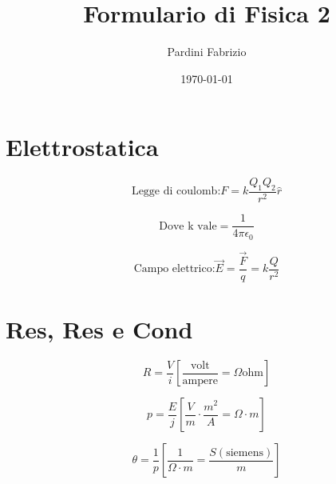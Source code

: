 \documentclass[a4paper,11pt]{article}
\begin{document}
	
	\setlength{\abovedisplayskip}{0pt}
	\setlength{\belowdisplayskip}{0pt}
	
	\title{\Large\bfseries Formulario di Fisica 2\vspace{-1em}}
	\author{Pardini Fabrizio\vspace{-1cm}}
	\date{\today\vspace{-1em}}
	\maketitle
	
	\begin{multicols}{3}
		\setlength{\columnseprule}{0.03pt}
		\def\columnseprulecolor{\color{black}}
		
		\section{Elettrostatica}
		
		
		\begin{equation}
			\text{Legge di coulomb:}F=k\frac{Q_{1}Q_{2}}{r^{2}}\hat{r}
		\end{equation}
	
		\begin{equation}
			\text{Dove k vale}=\frac{1}{4\pi\epsilon_{0}}
		\end{equation}
	
		
		\begin{equation}
			\text{Campo elettrico:}\vec{E}=\frac{\vec{F}}{q}=k\frac{Q}{r^{2}}
		\end{equation}
	
	
		\section{Res, Res e Cond}
		
		\begin{equation}
			R=\frac{V}{i} \left[
			\frac{\text{volt}}{\text{ampere}}=\Omega\text{ohm}
			\right]
		\end{equation}
	
		\begin{equation}
			p=\frac{E}{j} \left[
			\frac{V}{m} \cdot \frac{m^{2}}{A} = \Omega \cdot m
			\right]
		\end{equation}
	
		\begin{equation}
			\theta = \frac{1}{p} \left[
			\frac{1}{\Omega \cdot m} = \frac{S\left(
				\text{siemens}
				\right)
				}{m}
			\right]
		\end{equation}
		

\end{multicols}
\end{document}
